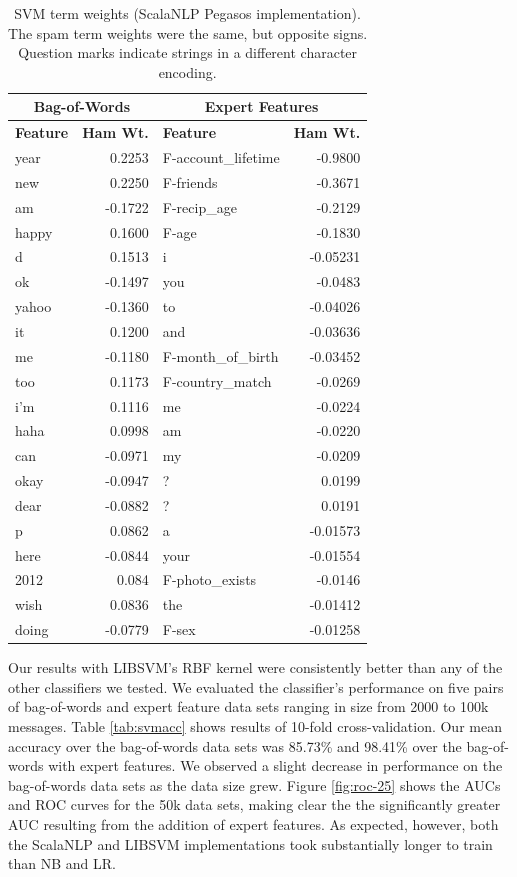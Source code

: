 \documentclass[preprint]{acm_proc_article-sp}
\begin{document}
\begin{table}
\small
\begin{tabular}{l|r||l|r}
\multicolumn{2}{c}{\textbf{Bag-of-Words}} & 
\multicolumn{2}{c}{\textbf{Expert Features}} \\
\hline
\textbf{Feature} & \textbf{Ham Wt.} & \textbf{Feature} & \textbf{Ham Wt.} \\
\hline

year & 0.2253 & F-account\_lifetime & -0.9800\\
new & 0.2250 & F-friends & -0.3671\\
am & -0.1722 & F-recip\_age & -0.2129\\
happy & 0.1600 & F-age & -0.1830\\
d & 0.1513 & i & -0.05231\\
ok & -0.1497 & you & -0.0483\\
yahoo & -0.1360 & to & -0.04026\\
it & 0.1200 & and & -0.03636\\
me & -0.1180 & F-month\_of\_birth & -0.03452\\
too & 0.1173 & F-country\_match & -0.0269\\
i'm & 0.1116 & me & -0.0224\\
haha & 0.0998 & am & -0.0220\\
can & -0.0971 & my & -0.0209\\
okay & -0.0947 & ? & 0.0199\\
dear & -0.0882 & ? & 0.0191\\
p & 0.0862 & a & -0.01573\\
here & -0.0844 & your & -0.01554\\
2012 & 0.084 & F-photo\_exists & -0.0146\\
wish & 0.0836 & the & -0.01412\\
doing & -0.0779 & F-sex & -0.01258\\

\end{tabular}
\caption{SVM term weights (ScalaNLP Pegasos implementation). The spam term weights were the same, but opposite signs.
Question marks indicate strings in a different character encoding.}
\label{tab:svmfeats}
\end{table}

Our results with LIBSVM's RBF kernel were consistently better than any of the other classifiers we tested. We 
evaluated the classifier's performance on five pairs of bag-of-words and expert feature data sets ranging in 
size from 2000 to 100k messages. Table \ref{tab:svmacc} shows results of 10-fold cross-validation. Our mean 
accuracy over the bag-of-words data sets was 85.73\% and 98.41\% over the bag-of-words with expert features. We 
observed a slight decrease in performance on the bag-of-words data sets as the data size grew. Figure \ref{fig:roc-25}
shows the AUCs and ROC curves for the 50k data sets, making clear the the significantly greater AUC resulting 
from the addition of expert features. As expected, however, both the ScalaNLP and LIBSVM implementations 
took substantially longer to train than NB and LR.
\end{document}
